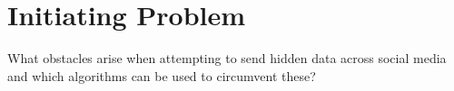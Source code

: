 \section*{Initiating Problem}
What obstacles arise when attempting to send hidden data across social media and which algorithms can be used to circumvent these?